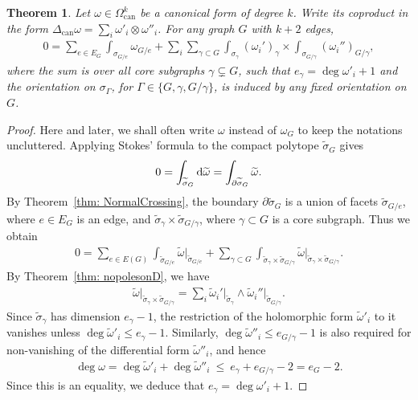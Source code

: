 \documentclass[pdftex]{sigma}%
\newtheorem{thm}{Theorem}[section]
\numberwithin{equation}{section}
\newcommand{\can}{\mathrm{can}}
\newcommand{\0}{\color{blue}{\mathsf{0}}}
\begin{document}
\begin{thm} Let $\omega \in \Omega^k_{\mathrm{can}}$ be a canonical form of degree $k$. Write its coproduct in the form
$\Delta_{\can} \omega = \sum_i \omega'_i \otimes \omega''_i$.
 For any graph $G$ with $k+2$ edges,
\begin{gather} \label{Stokes}
0 = \sum_{e \in E_G} \int_{\sigma_{G/e}} \omega_{G/e} + \sum_i \sum_{\gamma \subset G} \int_{\sigma_{\gamma}} (\omega_i')_{\gamma} \times \int_{\sigma_{G/\gamma}} (\omega_i'')_{G/\gamma},
\end{gather}
where the sum is over all core subgraphs $\gamma \subsetneq G$, such that
$e_{\gamma}= \deg \omega'_i+1$
and the orientation on $\sigma_{\Gamma}$, for $\Gamma \in \{G,\gamma, G/\gamma\}$, is induced by any fixed orientation on $G$.
 \end{thm}

\begin{proof} Here and later, we shall often write $\omega$ instead of $\omega_G$ to keep the notations uncluttered.
Applying Stokes' formula to the compact polytope $\widetilde{\sigma}_G$ gives
\begin{gather*}
0 = \int_{\widetilde{\sigma}_G} {\rm d} \widetilde{\omega} = \int_{\partial \widetilde{\sigma}_G} \widetilde{\omega} .
\end{gather*}
By Theorem~\ref{thm: NormalCrossing}, the boundary $\partial \widetilde{\sigma}_G$ is a union of facets $\widetilde{\sigma}_{G/e}$, where $e \in E_G$ is an edge, and
$\widetilde{\sigma}_{\gamma} \times \widetilde{\sigma}_{G/\gamma}$, where $\gamma \subset G$ is a core subgraph. Thus we obtain
\begin{gather*}
0 = \sum_{e \in E(G)} \int_{\widetilde{\sigma}_{G/e}} \widetilde{\omega}\big|_{\widetilde{\sigma}_{G/e}} + \sum_{\gamma \subset G} \int_{\widetilde{\sigma}_{\gamma} \times \widetilde{\sigma}_{G/\gamma}} \widetilde{\omega}\big|_{\widetilde{\sigma}_{\gamma} \times \widetilde{\sigma}_{G/\gamma}} .
\end{gather*}
By Theorem~\ref{thm: nopolesonD}, we have
\begin{gather*}
 \widetilde{\omega}\big|_{\widetilde{\sigma}_{\gamma} \times \widetilde{\sigma}_{G/\gamma}} = \sum_{i} \widetilde{\omega}_i'\big|_{\widetilde{\sigma}_{\gamma}} \wedge \widetilde{\omega}_i''\big|_{\widetilde{\sigma}_{G/\gamma}} .
 \end{gather*}
 Since $\widetilde{\sigma}_{\gamma}$ has dimension $e_{\gamma}-1$, the restriction of the holomorphic form $\widetilde{\omega}'_i$ to it vanishes unless $\deg \widetilde{\omega}'_i \leq e_{\gamma}-1$.
Similarly, $\deg \widetilde{\omega}''_i \leq e_{G/\gamma}-1$ is also required for non-vanishing of the differential form $ \widetilde{\omega}''_i $, and hence
\begin{gather*} \deg \omega = \deg \widetilde{\omega}'_i+ \deg \widetilde{\omega}''_i \ \leq \ e_{\gamma} +e_{G/\gamma}-2 = e_{G}-2 . \end{gather*}
Since this is an equality, we deduce that $e_{\gamma}= \deg \omega'_i+1$.
\end{proof}
\end{document}
